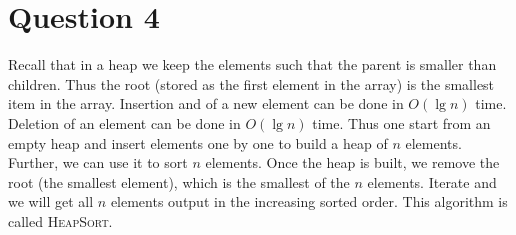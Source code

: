 \documentclass[11pt]{article}
\begin{document}
\section{Question 4} Recall that in a heap we keep the elements such that the parent is smaller than children. Thus the root (stored as the first element in the array) is the smallest item in the array. Insertion and of a new element can be done in $O(\lg n)$ time. Deletion of an element can be done in $O(\lg n)$ time. Thus one start from an empty heap and insert elements one by one to build a heap of $n$ elements. Further, we can use it to sort $n$ elements. Once the heap is built, we remove the root (the smallest element), which is the smallest of the $n$ elements. Iterate and we will get all $n$ elements output in the increasing sorted order.  This algorithm is called  \textsc{HeapSort}.
 
\end{document}
